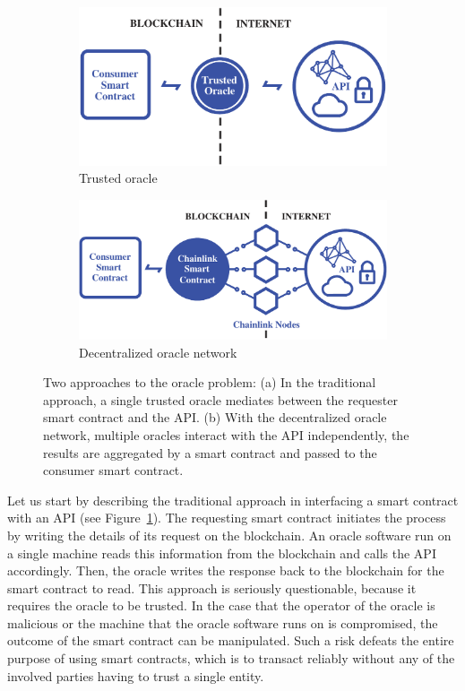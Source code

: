 \documentclass[12pt]{article}
\begin{document}
\begin{figure}
	\centering
	\begin{subfigure}{.5\textwidth}
		\centering
		\includegraphics[height=.45\linewidth]{Figures/oracle1}
		\caption{Trusted oracle}
		\label{fig:oracleproblem1}
	\end{subfigure}%
	\begin{subfigure}{.5\textwidth}
		\centering
		\includegraphics[height=.45\linewidth]{Figures/oracle2}
		\caption{Decentralized oracle network}
		\label{fig:oracleproblem2}
	\end{subfigure}
	\caption{Two approaches to the oracle problem:
		(a) In the traditional approach, a single trusted oracle mediates between the requester smart contract and the API.
		(b) With the decentralized oracle network, multiple oracles interact with the API independently, the results are aggregated by a smart contract and passed to the consumer smart contract.}
	\label{fig:oracleproblem}
\end{figure}

Let us start by describing the traditional approach in interfacing a smart contract with an API (see Figure~\ref{fig:oracleproblem1}).
The requesting smart contract initiates the process by writing the details of its request on the blockchain.
An oracle software run on a single machine reads this information from the blockchain and calls the API accordingly.
Then, the oracle writes the response back to the blockchain for the smart contract to read.
This approach is seriously questionable, because it requires the oracle to be trusted.
In the case that the operator of the oracle is malicious or the machine that the oracle software runs on is compromised, the outcome of the smart contract can be manipulated.
Such a risk defeats the entire purpose of using smart contracts, which is to transact reliably without any of the involved parties having to trust a single entity.
\end{document}
